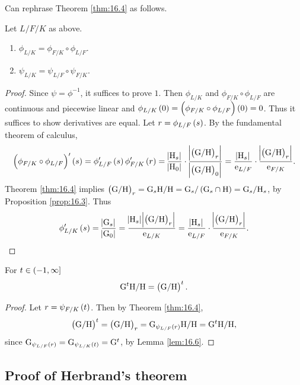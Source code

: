 Can rephrase Theorem \ref{thm:16.4} as follows.

\begin{lemma}
\label{lem:16.6}
Let $ L / F / K $ as above.
\begin{enumerate}
\item $ \phi_{L / K} = \phi_{F / K} \circ \phi_{L / F} $.
\item $ \psi_{L / K} = \psi_{L / F} \circ \psi_{F / K} $.
\end{enumerate}
\end{lemma}

\begin{proof}
Since $ \psi = \phi^{-1} $, it suffices to prove $ 1 $. Then $ \phi_{L / K} $ and $ \phi_{F / K} \circ \phi_{L / F} $ are continuous and piecewise linear and $ \phi_{L / K}\br{0} = \br{\phi_{F / K} \circ \phi_{L / F}}\br{0} = 0 $. Thus it suffices to show derivatives are equal. Let $ r = \phi_{L / F}\br{s} $. By the fundamental theorem of calculus,
$$ \br{\phi_{F / K} \circ \phi_{L / F}}'\br{s} = \phi_{L / F}'\br{s}\phi_{F / K}'\br{r} = \dfrac{\abs{\H_s}}{\abs{\H_0}} \cdot \dfrac{\abs{\br{\G / \H}_r}}{\abs{\br{\G / \H}_0}} = \dfrac{\abs{\H_s}}{\e_{L / F}} \cdot \dfrac{\abs{\br{\G / \H}_r}}{\e_{F / K}}. $$
Theorem \ref{thm:16.4} implies $ \br{\G / \H}_r = \G_s\H / \H = \G_s / \br{\G_s \cap \H} = \G_s / \H_s $, by Proposition \ref{prop:16.3}. Thus
$$ \phi_{L / K}'\br{s} = \dfrac{\abs{\G_s}}{\abs{\G_0}} = \dfrac{\abs{\H_s}\abs{\br{\G / \H}_r}}{\e_{L / K}} = \dfrac{\abs{\H_s}}{\e_{L / F}} \cdot \dfrac{\abs{\br{\G / \H}_r}}{\e_{F / K}}. $$
\end{proof}

\begin{corollary}
\label{cor:16.7}
For $ t \in \intoc{-1, \infty} $
$$ \G^t\H / \H = \br{\G / \H}^t. $$
\end{corollary}

\begin{proof}
Let $ r = \psi_{F / K}\br{t} $. Then by Theorem \ref{thm:16.4},
$$ \br{\G / \H}^t = \br{\G / \H}_r = \G_{\psi_{L / F}\br{r}}\H / \H = \G^t\H / \H, $$
since $ \G_{\psi_{L / F}\br{r}} = \G_{\psi_{L / K}\br{t}} = \G^t $, by Lemma \ref{lem:16.6}.
\end{proof}

\subsection{Proof of Herbrand's theorem}


